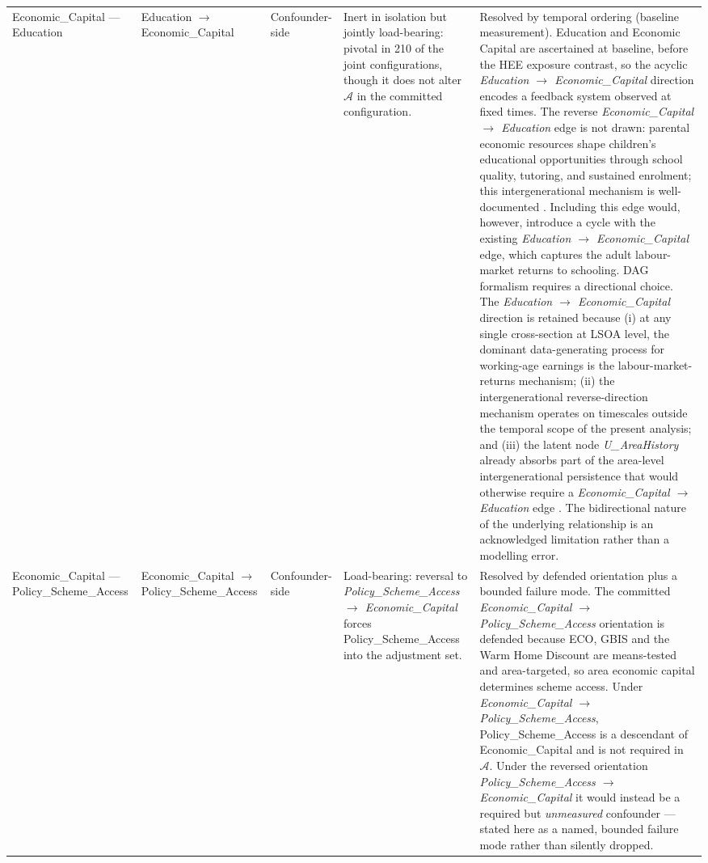 \begin{longtable}{@{}p{1.9cm}p{1.9cm}p{1.4cm}p{2.7cm}p{4.9cm}@{}}
\addlinespace
Economic\_Capital --- Education & Education $\to$ Economic\_Capital & Confounder-side & Inert in isolation but jointly load-bearing: pivotal in 210 of the joint configurations, though it does not alter $\mathcal{A}$ in the committed configuration. & Resolved by temporal ordering (baseline measurement). Education and Economic Capital are ascertained at baseline, before the HEE exposure contrast, so the acyclic \textit{Education $\to$ Economic\_Capital} direction encodes a feedback system observed at fixed times. The reverse \textit{Economic\_Capital $\to$ Education} edge is not drawn: parental economic resources shape children's educational opportunities through school quality, tutoring, and sustained enrolment; this intergenerational mechanism is well-documented \citep{blanden_educational_2013}. Including this edge would, however, introduce a cycle with the existing \textit{Education $\to$ Economic\_Capital} edge, which captures the adult labour-market returns to schooling. DAG formalism requires a directional choice. The \textit{Education $\to$ Economic\_Capital} direction is retained because (i) at any single cross-section at LSOA level, the dominant data-generating process for working-age earnings is the labour-market-returns mechanism; (ii) the intergenerational reverse-direction mechanism operates on timescales outside the temporal scope of the present analysis; and (iii) the latent node \textit{U\_AreaHistory} already absorbs part of the area-level intergenerational persistence that would otherwise require a \textit{Economic\_Capital $\to$ Education} edge \citep{lloyd_50-year_2024}. The bidirectional nature of the underlying relationship is an acknowledged limitation rather than a modelling error. \\
\addlinespace
Economic\_Capital --- Policy\_Scheme\_Access & Economic\_Capital $\to$ Policy\_Scheme\_Access & Confounder-side & Load-bearing: reversal to \textit{Policy\_Scheme\_Access $\to$ Economic\_Capital} forces Policy\_Scheme\_Access into the adjustment set. & Resolved by defended orientation plus a bounded failure mode. The committed \textit{Economic\_Capital $\to$ Policy\_Scheme\_Access} orientation is defended because ECO, GBIS and the Warm Home Discount are means-tested and area-targeted, so area economic capital determines scheme access. Under \textit{Economic\_Capital $\to$ Policy\_Scheme\_Access}, Policy\_Scheme\_Access is a descendant of Economic\_Capital and is not required in $\mathcal{A}$. Under the reversed orientation \textit{Policy\_Scheme\_Access $\to$ Economic\_Capital} it would instead be a required but \emph{unmeasured} confounder --- stated here as a named, bounded failure mode rather than silently dropped. \\

\end{longtable}
